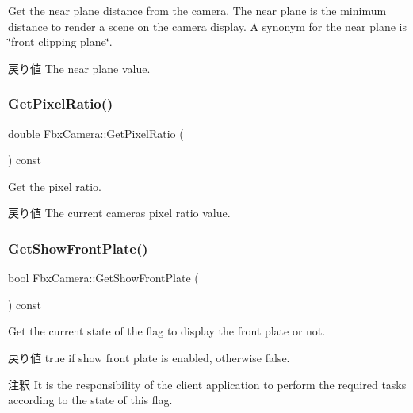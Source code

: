 Get the near plane distance from the camera. The near plane is the minimum distance to render a scene on the camera display. A synonym for the near plane is \char`\"{}front clipping plane\char`\"{}. \begin{DoxyReturn}{戻り値}
The near plane value. 
\end{DoxyReturn}
\mbox{\label{class_fbx_camera_ae12fca0cd15518d611dbe26f2b6babbf}} 
\subsubsection{\texorpdfstring{Get\+Pixel\+Ratio()}{GetPixelRatio()}}
{\footnotesize\ttfamily double Fbx\+Camera\+::\+Get\+Pixel\+Ratio (\begin{DoxyParamCaption}{ }\end{DoxyParamCaption}) const}

Get the pixel ratio. \begin{DoxyReturn}{戻り値}
The current camera\textquotesingle{}s pixel ratio value. 
\end{DoxyReturn}
\mbox{\label{class_fbx_camera_ab21048c80c2139f248b1c75cb79fae0b}} 
\subsubsection{\texorpdfstring{Get\+Show\+Front\+Plate()}{GetShowFrontPlate()}}
{\footnotesize\ttfamily bool Fbx\+Camera\+::\+Get\+Show\+Front\+Plate (\begin{DoxyParamCaption}{ }\end{DoxyParamCaption}) const}

Get the current state of the flag to display the front plate or not. \begin{DoxyReturn}{戻り値}
{\ttfamily true} if show front plate is enabled, otherwise {\ttfamily false}. 
\end{DoxyReturn}
\begin{DoxyRemark}{注釈}
It is the responsibility of the client application to perform the required tasks according to the state of this flag. 
\end{DoxyRemark}
\mbox{\label{class_fbx_camera_ac9e1f4cc33e3c927932c577d95c6cd93}} 
